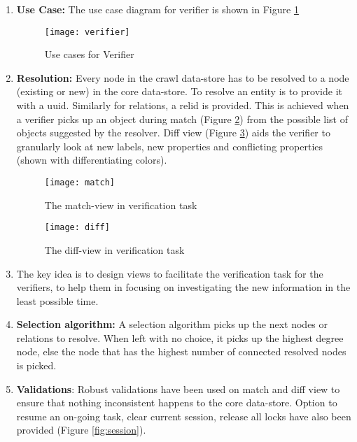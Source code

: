 \begin{enumerate}

\item \textbf{Use Case:} The use case diagram for verifier is shown in Figure \ref{fig:verifier}


\begin{figure}[H]
\begin{center}  
\texttt{[image: verifier]} 
\caption{Use cases for Verifier}
\label{fig:verifier}
\end{center}
\end{figure}
 
\item \textbf{Resolution:} Every node in the crawl data-store has to be resolved to a node (existing or new) in the core data-store. To resolve an entity is to provide it with a uuid. Similarly for relations, a relid is provided. This is achieved when a verifier picks up an object during match (Figure \ref{fig:match}) from the possible list of objects suggested by the resolver. Diff view (Figure \ref{fig:diff}) aids the verifier to granularly look at new labels, new properties and conflicting properties (shown with differentiating colors).

\begin{figure}[H]
\begin{center}  
\texttt{[image: match]} 
\caption{The match-view in verification task}
\label{fig:match}
\end{center}
\end{figure}

\begin{figure}[H]
\begin{center}  
\texttt{[image: diff]} 
\caption{The diff-view in verification task}
\label{fig:diff}
\end{center}
\end{figure}

\item The key idea is to design views to facilitate the verification task for the verifiers, to help them in focusing on investigating the new information in the least possible time. 

\item \textbf{Selection algorithm:} A selection algorithm picks up the next nodes or relations to resolve. When left with no choice, it picks up the highest degree node, else the node that has the highest number of connected resolved nodes is picked.

\item \textbf{Validations}: Robust validations have been used on match and diff view to ensure that nothing inconsistent happens to the core data-store. Option to resume an on-going task, clear current session, release all locks have also been provided (Figure \ref{fig:session}).


\end{enumerate}
